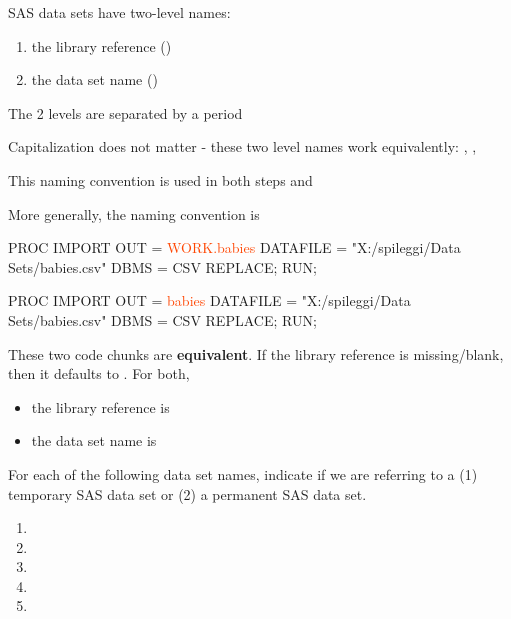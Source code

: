 \begin{frame}
\bi
\item SAS data sets have two-level names: 
	\begin{enumerate}
	\item the library reference ()
	\item the data set name ()
	\end{enumerate}
	\item The 2 levels are separated by a period
    \item Capitalization does not matter - these two level names work equivalently: , , 
    \item This naming convention is used in both  steps and 
    \item More generally, the naming convention is 
\ei
\end{frame}


\begin{frame}[fragile]
\footnotesize
\hspace*{-1in}
\begin{code}{.0}
PROC IMPORT OUT = \textcolor{OrangeRed}{WORK.babies}
   DATAFILE = "X:/spileggi/Data Sets/babies.csv"
   DBMS = CSV REPLACE;
RUN;

PROC IMPORT OUT = \textcolor{OrangeRed}{babies}
   DATAFILE = "X:/spileggi/Data Sets/babies.csv"
   DBMS = CSV REPLACE;
RUN;
\end{code}
\emp
\vskip10pt
These two code chunks are \textbf{equivalent}. If the library reference is missing/blank, then it defaults to . For both, \\
\begin{itemize}
\item the library reference is 
\item the data set name is 
\end{itemize}
\end{frame}

\begin{frame}
\fto
\begin{clicker}{For each of the following data set names, indicate if we are referring to a (1) temporary SAS data set or (2) a permanent SAS data set.}
\begin{enumerate}
\item {}
\item {}
\item {}
\item {}
\item {}
\end{enumerate}
\end{clicker}
\end{frame}

